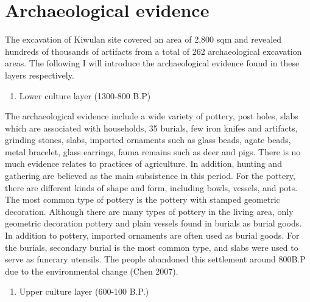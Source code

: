 \documentclass[10pt]{article}
\begin{document}
\section*{Archaeological evidence}\label{archaeological-evidence}

The excavation of Kiwulan site covered an area of 2,800 sqm and revealed
hundreds of thousands of artifacts from a total of 262 archaeological
excavation areas. The following I will introduce the archaeological
evidence found in these layers respectively.

\begin{enumerate}
\def\labelenumi{\arabic{enumi}.}
\itemsep1pt\parskip0pt
\item
  Lower culture layer (1300-800 B.P)
\end{enumerate}

The archaeological evidence include a wide variety of pottery, post
holes, slabs which are associated with households, 35 burials, few iron
knifes and artifacts, grinding stones, slabs, imported ornaments such as
glass beads, agate beads, metal bracelet, glass earrings, fauna remains
such as deer and pigs. There is no much evidence relates to practices of
agriculture. In addition, hunting and gathering are believed as the main
subsistence in this period. For the pottery, there are different kinds
of shape and form, including bowls, vessels, and pots. The most common
type of pottery is the pottery with stamped geometric decoration.
Although there are many types of pottery in the living area, only
geometric decoration pottery and plain vessels found in burials as
burial goods. In addition to pottery, imported ornaments are often used
as burial goods. For the burials, secondary burial is the most common
type, and slabs were used to serve as funerary utensils. The people
abandoned this settlement around 800B.P due to the environmental change
(Chen 2007).

\begin{enumerate}
\def\labelenumi{\arabic{enumi}.}
\setcounter{enumi}{1}
\itemsep1pt\parskip0pt
\item
  Upper culture layer (600-100 B.P.)
\end{enumerate}
\end{document}
